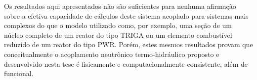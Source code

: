 %
%
%
%
%

Os resultados aqui apresentados não são suficientes para nenhuma afirmação sobre a
efetiva capacidade de cálculos deste sistema acoplado para sistemas mais complexos
do que o modelo utilizado como, por exemplo, uma seção de um núcleo completo de um
reator do tipo TRIGA ou um elemento combustível reduzido de um reator do tipo PWR.
Porém, estes mesmos resultados provam que conceitualmente o acoplamento neutrônico
termo-hidráulico proposto e desenvolvido nesta tese é fisicamente e computacionalmente
consistente, além de funcional.

